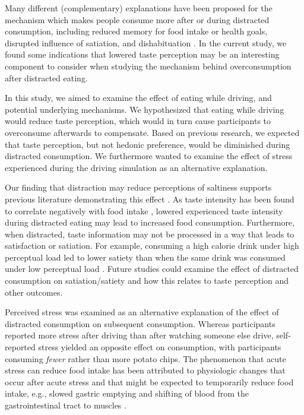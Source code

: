 \documentclass[authordate, empirical]{jote-new-article}
\begin{document}
Many different (complementary) explanations have been proposed for the mechanism which makes people consume more after or during distracted consumption, including reduced memory for food intake or health goals, disrupted influence of satiation, and dishabituation \parencites{Forde2018}{Robinson2013}. In the current study, we found some indications that lowered taste perception may be an interesting component to consider when studying the mechanism behind overconsumption after distracted eating.

\begin{originalPurpose}
  In this study, we aimed to examine the effect of eating while driving, and potential underlying mechanisms. We hypothesized that eating while driving would reduce taste perception, which would in turn cause participants to overconsume afterwards to compensate. Based on previous research, we expected that taste perception, but not hedonic preference, would be diminished during distracted consumption. We furthermore wanted to examine the effect of stress experienced during the driving simulation as an alternative explanation.
\end{originalPurpose}


Our finding that distraction may reduce perceptions of saltiness supports previous literature demonstrating this effect \parencites{Wal2013}{Liang2018}{Duif2020}. As taste intensity has been found to correlate negatively with food intake \parencites{Forde2013}, lowered experienced taste intensity during distracted eating may lead to increased food consumption. Furthermore, when distracted, taste information may not be processed in a way that leads to satisfaction or satiation. For example, consuming a high calorie drink under high perceptual load led to lower satiety than when the same drink was consumed under low perceptual load \parencites{Morris2020}. Future studies could examine the effect of distracted consumption on satiation/satiety and how this relates to taste perception and other outcomes.



Perceived stress was examined as an alternative explanation of the effect of distracted consumption on subsequent consumption. Whereas participants reported more stress after driving than after watching someone else drive, self-reported stress yielded an opposite effect on consumption, with participants consuming \emph{fewer} rather than more potato chips. The phenomenon that acute stress can reduce food intake has been attributed to physiologic changes that occur after acute stress and that might be expected to temporarily reduce food intake, e.g., slowed gastric emptying and shifting of blood from the gastrointestinal tract to muscles \parencites{Torres2007}.
\end{document}
